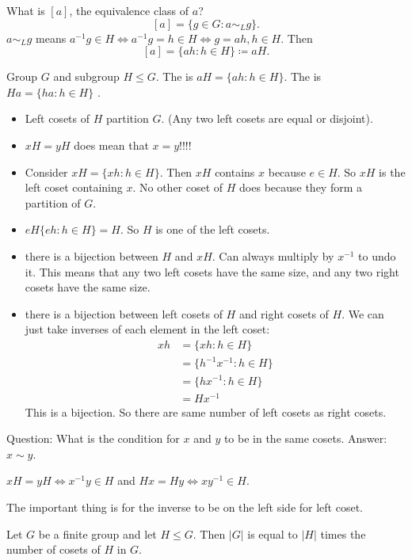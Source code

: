 \documentclass[class=article,crop=false]{standalone}
\begin{document}
What is $ [a]$, the equivalence class of  $ a$?
 \[
	 [a] = \{g \in G: a \sim_L g\} 
.\]
$ a \sim_L g$ means $ a^{-1} g \in H \iff a^{-1} g = h \in H \iff g=ah, h \in H$.
Then
\[
	[a] = \{ah:h \in H\} \coloneqq aH
.\] 
\begin{defn}[cosets]
Group $ G$ and subgroup  $ H\leq G$. The  is $ aH = \{ah: h \in H\} $. The  is $ Ha=\{ha: h \in H\} $  .
\end{defn}
\begin{property}
\begin{itemize}
	\item Left cosets of $ H$ partition  $ G$. (Any two left cosets are equal or disjoint).
	\item $ xH = yH$ does   mean that $ x=y$!!!!
	\item Consider  $ xH= \{xh: h \in H\} $. Then $xH $ contains  $ x$ because  $ e \in H$. So $ xH$ is the left coset containing  $ x$. No other coset of $ H$ does because they form a partition of $ G$. 
	\item $ eH \{eh: h \in H\} =H $. So $ H $ is one of the left cosets.
	\item there is a bijection between $ H$ and  $ xH$. Can always multiply by  $ x^{-1}$ to undo it. This means that any two left cosets have the same size, and any two right cosets have the same size.
	\item there is a bijection between left cosets of $ H$ and right cosets of  $ H$. We can just take inverses of each element in the left coset:
		 \begin{align*}
			xh&= \{xh : h \in H\}  \\
			&= \{ h^{-1}x^{-1}: h \in H\}  \\
			&= \{ h x^{-1}: h \in H\}  \\
			&= H x^{-1} 
		\end{align*}
		This is a bijection. So there are same number of left cosets as right cosets.
\end{itemize}
\end{property}

Question: What is the condition for $ x$ and  $ y$ to be in the same cosets. Answer:  $ x \sim y$.

\begin{thm}[]
$ xH = yH \iff x^{-1}y \in H$ and $ Hx = Hy \iff xy^{-1} \in H$.
\end{thm}
\begin{note}[]
The important thing is for the inverse to be on the left side for left coset.
\end{note}
\begin{thm}
	Let $ G$ be a finite group and let  $ H \leq G$. Then  $ |G|$ is equal to  $ |H|$ times the number of cosets of  $ H$ in  $ G$.
\end{thm}
\end{document}
